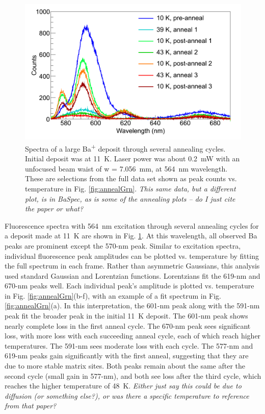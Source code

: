 \begin{figure} %
        \centering
                \includegraphics[width=.95\textwidth]{figures/spectra_annealing.png}
                \caption{Spectra of a large Ba\textsuperscript{+} deposit through several annealing cycles.  Initial deposit was at 11~K.  Laser power was about 0.2~mW with an unfocused beam waist of w = 7.056~mm, at 564~nm wavelength.  These are selections from the full data set shown as peak counts vs. temperature in Fig. \ref{fig:annealGrn}.  \emph{\color{red}This same data, but a different plot, is in BaSpec, as is some of the annealing plots -- do I just cite the paper or what?}}
\label{fig:specAnneal}
\end{figure}

Fluorescence spectra with 564~nm excitation through several annealing cycles for a deposit made at 11~K are shown in Fig. \ref{fig:specAnneal}.  At this wavelength, all observed Ba peaks are prominent except the 570-nm peak.  Similar to excitation spectra, individual fluorescence peak amplitudes can be plotted vs. temperature by fitting the full spectrum in each frame.  Rather than asymmetric Gaussians, this analysis used standard Gaussian and Lorentzian functions.  Lorentzians fit the 619-nm and 670-nm peaks well.  Each individual peak's amplitude is plotted vs. temperature in Fig. \ref{fig:annealGrn}(b-f), with an example of a fit spectrum in Fig. \ref{fig:annealGrn}(a).  In this interpretation, the 601-nm peak along with the 591-nm peak fit the broader peak in the initial 11~K deposit.  The 601-nm peak shows nearly complete loss in the first anneal cycle.  The 670-nm peak sees significant loss, with more loss with each succeeding anneal cycle, each of which reach higher temperatures.  The 591-nm sees moderate loss with each cycle.  The 577-nm and 619-nm peaks gain significantly with the first anneal, suggesting that they are due to more stable matrix sites.  Both peaks remain about the same after the second cycle (small gain in 577-nm), and both see loss after the third cycle, which reaches the higher temperature of 48~K. \emph{\color{gray}Either just say this could be due to diffusion (or something else?), or was there a specific temperature to reference from that paper?}

